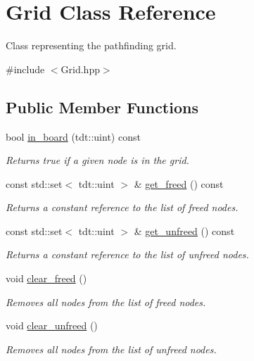 \hypertarget{class_grid}{}\section{Grid Class Reference}
\label{class_grid}


Class representing the pathfinding grid.  




{\ttfamily \#include $<$Grid.\+hpp$>$}

\subsection*{Public Member Functions}
\begin{DoxyCompactItemize}
\item 
bool \hyperlink{class_grid_aed4ad076f87a3d98aad3c2b8c9103cef}{in\+\_\+board} (tdt\+::uint) const 
\begin{DoxyCompactList}\small\item\em Returns true if a given node is in the grid. \end{DoxyCompactList}\item 
const std\+::set$<$ tdt\+::uint $>$ \& \hyperlink{class_grid_a873fe20b463f75787f7403026e1deb81}{get\+\_\+freed} () const 
\begin{DoxyCompactList}\small\item\em Returns a constant reference to the list of freed nodes. \end{DoxyCompactList}\item 
const std\+::set$<$ tdt\+::uint $>$ \& \hyperlink{class_grid_af9bc45a2e906d4b4d62ca103358be426}{get\+\_\+unfreed} () const 
\begin{DoxyCompactList}\small\item\em Returns a constant reference to the list of unfreed nodes. \end{DoxyCompactList}\item 
void \hyperlink{class_grid_a260f0a33ba3928db375c868bc0e9deba}{clear\+\_\+freed} ()
\begin{DoxyCompactList}\small\item\em Removes all nodes from the list of freed nodes. \end{DoxyCompactList}\item 
void \hyperlink{class_grid_a983d2e90daf188754c12060977b8492c}{clear\+\_\+unfreed} ()
\begin{DoxyCompactList}\small\item\em Removes all nodes from the list of unfreed nodes. \end{DoxyCompactList}\item 

\end{DoxyCompactItemize}
